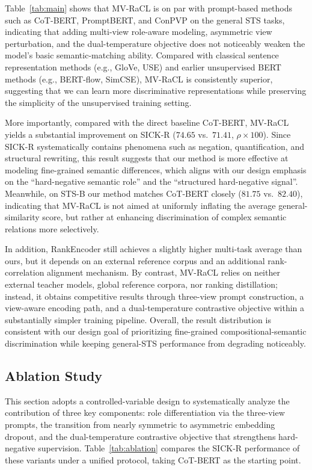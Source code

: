 \documentclass[a4paper,fleqn]{cas-dc}
\begin{document}
Table~\ref{tab:main} shows that MV-RaCL is on par with prompt-based methods such as CoT-BERT, PromptBERT, and ConPVP on the general STS tasks, indicating that adding multi-view role-aware modeling, asymmetric view perturbation, and the dual-temperature objective does not noticeably weaken the model's basic semantic-matching ability. Compared with classical sentence representation methods (e.g., GloVe, USE) and earlier unsupervised BERT methods (e.g., BERT-flow, SimCSE), MV-RaCL is consistently superior, suggesting that we can learn more discriminative representations while preserving the simplicity of the unsupervised training setting.

More importantly, compared with the direct baseline CoT-BERT, MV-RaCL yields a substantial improvement on SICK-R ($74.65$ vs.\ $71.41$, $\rho \times 100$). Since SICK-R systematically contains phenomena such as negation, quantification, and structural rewriting, this result suggests that our method is more effective at modeling fine-grained semantic differences, which aligns with our design emphasis on the ``hard-negative semantic role'' and the ``structured hard-negative signal''. Meanwhile, on STS-B our method matches CoT-BERT closely ($81.75$ vs.\ $82.40$), indicating that MV-RaCL is not aimed at uniformly inflating the average general-similarity score, but rather at enhancing discrimination of complex semantic relations more selectively.

In addition, RankEncoder still achieves a slightly higher multi-task average than ours, but it depends on an external reference corpus and an additional rank-correlation alignment mechanism. By contrast, MV-RaCL relies on neither external teacher models, global reference corpora, nor ranking distillation; instead, it obtains competitive results through three-view prompt construction, a view-aware encoding path, and a dual-temperature contrastive objective within a substantially simpler training pipeline. Overall, the result distribution is consistent with our design goal of prioritizing fine-grained compositional-semantic discrimination while keeping general-STS performance from degrading noticeably.

\subsection{Ablation Study}
\label{subsec:ablation}

This section adopts a controlled-variable design to systematically analyze the contribution of three key components: role differentiation via the three-view prompts, the transition from nearly symmetric to asymmetric embedding dropout, and the dual-temperature contrastive objective that strengthens hard-negative supervision. Table~\ref{tab:ablation} compares the SICK-R performance of these variants under a unified protocol, taking CoT-BERT as the starting point.
\end{document}
